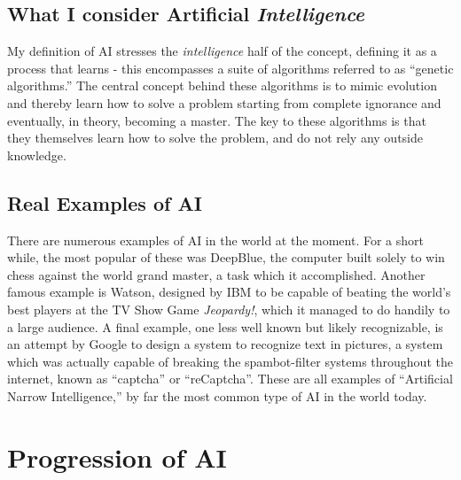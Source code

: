 \documentclass[12pt]{article} %
\begin{document}

\subsection{What I consider Artificial \textit{Intelligence}}

My definition of AI stresses the \textit{intelligence} half of the concept, defining it as a process that learns - this encompasses a suite of algorithms referred to as ``genetic algorithms.'' The central concept behind these algorithms is to mimic evolution and thereby learn how to solve a problem starting from complete ignorance and eventually, in theory, becoming a master. The key to these algorithms is that they themselves learn how to solve the problem, and do not rely any outside knowledge.


\subsection{Real Examples of AI}

There are numerous examples of AI in the world at the moment. For a short while, the most popular of these was DeepBlue, the computer built solely to win chess against the world grand master, a task which it accomplished\cite{deepblue}. Another famous example is Watson, designed by IBM to be capable of beating the world's best players at the TV Show Game \textit{Jeopardy!}\cite{watson}, which it managed to do handily to a large audience\cite{watsonwins}. A final example, one less well known but likely recognizable, is an attempt by Google to design a system to recognize text in pictures, a system which was actually capable of breaking the spambot-filter systems throughout the internet, known as ``captcha'' or ``reCaptcha''. These are all examples of ``Artificial Narrow Intelligence,'' by far the most common type of AI in the world today.


\section{Progression of AI}

\end{document}
